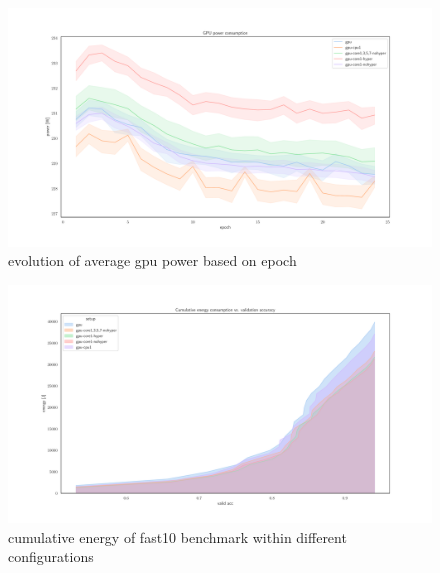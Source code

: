 \begin{figure}
    \centering
    \includegraphics[width=\linewidth]{imgs/power_gpu_baedonepoche}
    \caption{evolution of average gpu power based on epoch  }
    \label{fig:p2}
\end{figure}
\begin{figure}
    \centering
    \includegraphics[width=\linewidth]{imgs/cumulative_energy_fast10}
    \caption{cumulative energy of fast10 benchmark within different configurations }
    \label{fig:p2}
\end{figure}



